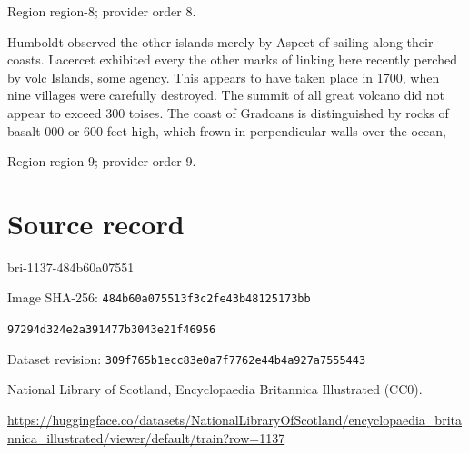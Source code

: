 \documentclass[11pt]{article}
\begin{document}
{\scriptsize\color{gray} Region region-8; provider order 8.\par}
\medskip

Humboldt observed the other islands merely by Aspect of sailing along their coasts. Lacercet exhibited every the other marks of linking here recently perched by volc Islands, some agency. This appears to have taken place in 1700, when nine villages were carefully destroyed. The summit of all great volcano did not appear to exceed 300 toises. The coast of Gradoans is distinguished by rocks of basalt 000 or 600 feet high, which frown in perpendicular walls over the ocean,
\par

{\scriptsize\color{gray} Region region-9; provider order 9.\par}
\medskip
\newpage\section*{Source record}
bri-1137-484b60a07551\par
Image SHA-256: \texttt{484b60a075513f3c2fe43b48125173bb}\par\texttt{97294d324e2a391477b3043e21f46956}\par
Dataset revision: \texttt{309f765b1ecc83e0a7f7}\texttt{762e44b4a927a7555443}\par
National Library of Scotland, Encyclopaedia Britannica Illustrated (CC0).\par
\url{https://huggingface.co/datasets/NationalLibraryOfScotland/encyclopaedia_britannica_illustrated/viewer/default/train?row=1137}
\end{document}
